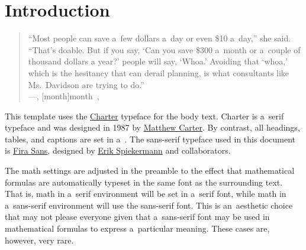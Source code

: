 


\renewcommand{\blindmarkup}[1]{\emph{#1}}
\blindmathfalse


\section{Introduction}
\label{sec:introduction}

\begin{quote}
``Most people can save a~few dollars a~day or even \$10 a~day,'' she said. ``That’s doable. But if you say, `Can you save \$300 a~month or a~couple of thousand dollars a year?' people will say, `Whoa.' Avoiding that `whoa,' which is the hesitancy that can derail planning, is what consultants like Ms.~Davidson are trying to do.'' \\
\upshape
\mbox{}\hfill---\textit{}, [month]{month}~, 
\end{quote}

%
%
%
%
%

\noindent%
This template uses the \href{https://en.wikipedia.org/wiki/Bitstream_Charter}{Charter} typeface for the body text. Charter is a~serif type\-face and was designed in 1987 by \href{https://en.wikipedia.org/wiki/Matthew_Carter}{Matthew Carter}. By contrast, all headings, tables, and captions are set in a~. The sans-serif typeface used in this document is \href{https://en.wikipedia.org/wiki/Fira_Sans}{Fira Sans}, designed by \href{https://en.wikipedia.org/wiki/Erik_Spiekermann}{Erik Spiekermann} and collaborators.

The math settings are adjusted in the preamble to the effect that mathematical formulas are automatically typeset in the same font as the surrounding text. That is, math in a~serif environment will be set in a~serif font, while math in a~sans-serif environment will use the sans-serif font. This is an~aesthetic choice that may not please everyone given that a~sans-serif font may be used in mathematical formulas to express a~particular meaning. These cases are, however, very rare.

